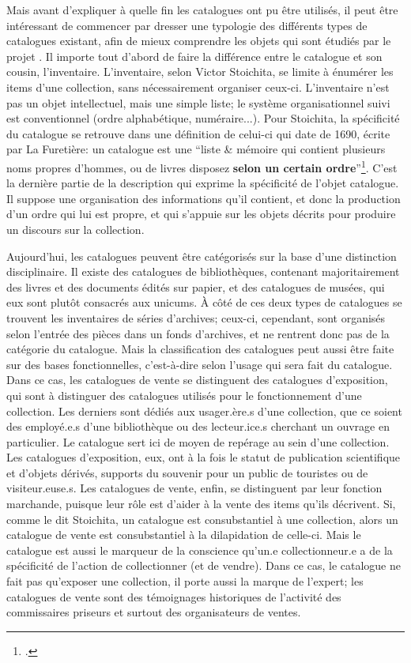 Mais avant d'expliquer à quelle fin les catalogues ont pu être utilisés, il peut être intéressant de commencer par dresser une typologie des différents types de catalogues existant, afin de mieux comprendre les objets qui sont étudiés par le projet \mssktb{}. Il importe tout d'abord de faire la différence entre le catalogue et son cousin, l'inventaire. L'inventaire, selon Victor Stoichita, se limite à énumérer les items d'une collection, sans nécessairement organiser ceux-ci. L'inventaire n'est pas un objet intellectuel, mais une simple liste; le système organisationnel suivi est conventionnel (ordre alphabétique, numéraire...). Pour Stoichita, la spécificité du catalogue se retrouve dans une définition de celui-ci qui date de 1690, écrite par La Furetière: un catalogue est une \enquote{liste \& mémoire qui contient plusieurs noms propres d'hommes, ou de livres disposez \textbf{selon un certain ordre}}\footcite[p. 122, le gras est ajouté par moi-même]{stoichita_instauration_1993}. C'est la dernière partie de la description qui exprime la spécificité de l'objet catalogue. Il suppose une organisation des informations qu'il contient, et donc la production d'un ordre qui lui est propre, et qui s'appuie sur les objets décrits pour produire un discours sur la collection.

Aujourd'hui, les catalogues peuvent être catégorisés sur la base d'une distinction disciplinaire. Il existe des catalogues de bibliothèques, contenant majoritairement des livres et des documents édités sur papier, et des catalogues de musées, qui eux sont plutôt consacrés aux unicums. À côté de ces deux types de catalogues se trouvent les inventaires de séries d'archives; ceux-ci, cependant, sont organisés selon l'entrée des pièces dans un fonds d'archives, et ne rentrent donc pas de la catégorie du catalogue. Mais la classification des catalogues peut aussi être faite sur des bases fonctionnelles, c'est-à-dire selon l'usage qui sera fait du catalogue. Dans ce cas, les catalogues de vente se distinguent des catalogues d'exposition, qui sont à distinguer des catalogues utilisés pour le fonctionnement d'une collection. Les derniers sont dédiés aux usager.ère.s d'une collection, que ce soient des employé.e.s d'une bibliothèque ou des lecteur.ice.s cherchant un ouvrage en particulier. Le catalogue sert ici de moyen de repérage au sein d'une collection. Les catalogues d'exposition, eux, ont à la fois le statut de publication scientifique et d'objets dérivés, supports du souvenir pour un public de touristes ou de visiteur.euse.s. Les catalogues de vente, enfin, se distinguent par leur fonction marchande, puisque leur rôle est d'aider à la vente des items qu'ils décrivent. Si, comme le dit Stoichita, un catalogue est consubstantiel à une collection, alors un catalogue de vente est consubstantiel à la dilapidation de celle-ci. Mais le catalogue est aussi le marqueur de la conscience qu'un.e collectionneur.e a de la spécificité de l'action de collectionner (et de vendre). Dans ce cas, le catalogue ne fait pas qu'exposer une collection, il porte aussi la marque de l'expert; les catalogues de vente sont des témoignages historiques de l'activité des commissaires priseurs et surtout des organisateurs de ventes.

